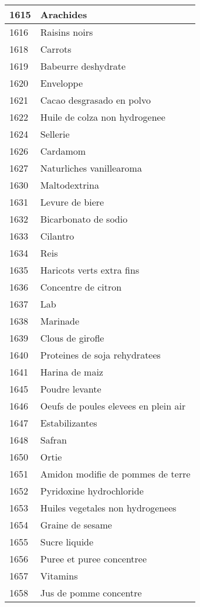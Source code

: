 \begin{longtable}{|l|l|}
1615 & Arachides \\ \hline 
1616 & Raisins noirs \\ \hline 
1618 & Carrots \\ \hline 
1619 & Babeurre deshydrate \\ \hline 
1620 & Enveloppe \\ \hline 
1621 & Cacao desgrasado en polvo \\ \hline 
1622 & Huile de colza non hydrogenee \\ \hline 
1624 & Sellerie \\ \hline 
1626 & Cardamom \\ \hline 
1627 & Naturliches vanillearoma \\ \hline 
1630 & Maltodextrina \\ \hline 
1631 & Levure de biere \\ \hline 
1632 & Bicarbonato de sodio \\ \hline 
1633 & Cilantro \\ \hline 
1634 & Reis \\ \hline 
1635 & Haricots verts extra fins \\ \hline 
1636 & Concentre de citron \\ \hline 
1637 & Lab \\ \hline 
1638 & Marinade \\ \hline 
1639 & Clous de girofle \\ \hline 
1640 & Proteines de soja rehydratees \\ \hline 
1641 & Harina de maiz \\ \hline 
1645 & Poudre levante \\ \hline 
1646 & Oeufs de poules elevees en plein air \\ \hline 
1647 & Estabilizantes \\ \hline 
1648 & Safran \\ \hline 
1650 & Ortie \\ \hline 
1651 & Amidon modifie de pommes de terre \\ \hline 
1652 & Pyridoxine hydrochloride \\ \hline 
1653 & Huiles vegetales non hydrogenees \\ \hline 
1654 & Graine de sesame \\ \hline 
1655 & Sucre liquide \\ \hline 
1656 & Puree et puree concentree \\ \hline 
1657 & Vitamins \\ \hline 
1658 & Jus de pomme concentre \\ \hline 

\end{longtable}
